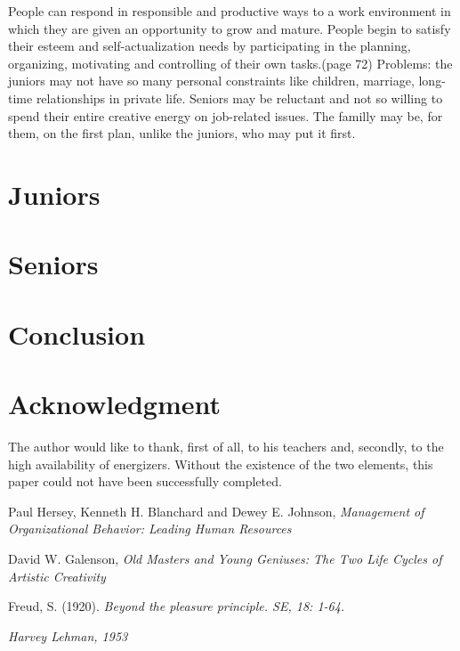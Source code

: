 \documentclass[conference]{IEEEtran}
\begin{document}
\newline\indent
People can respond in responsible and productive ways to a work environment in which they are given an opportunity to grow and mature. People begin to satisfy their esteem and self-actualization needs by participating in the planning, organizing, motivating and controlling of their own tasks.(page 72)
\newline\indent
Problems: the juniors may not have so many personal constraints like children, marriage, long-time relationships in private life. Seniors may be reluctant and not so willing to spend their entire creative energy on job-related issues. The familly may be, for them, on the first plan, unlike the juniors, who may put it first.

\section{Juniors}
\section{Seniors}

\newpage
\section{Conclusion}

\section*{Acknowledgment}
The author would like to thank, first of all, to his teachers and, secondly, to the high availability of energizers. Without the existence of the two elements, this paper could not have been successfully completed. 

\newpage
\begin{thebibliography}{99}


Paul Hersey, Kenneth H. Blanchard and Dewey E. Johnson, \emph{Management of Organizational Behavior: Leading Human Resources}

David W. Galenson, \emph{Old Masters and Young Geniuses: The Two Life Cycles of Artistic Creativity}

Freud, S. (1920). \emph{Beyond the pleasure principle. SE, 18: 1-64.}

\emph{Harvey Lehman, 1953} 

\end{thebibliography}
\end{document}
